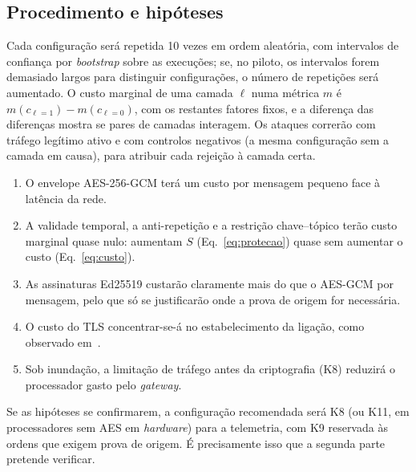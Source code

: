 \subsection{Procedimento e hipóteses}

Cada configuração será repetida 10 vezes em ordem aleatória, com intervalos de
confiança por \emph{bootstrap} sobre as execuções; se, no piloto, os intervalos forem
demasiado largos para distinguir configurações, o número de repetições será
aumentado. O custo marginal de uma camada
$\ell$ numa métrica $m$ é $m(c_{\ell=1}) - m(c_{\ell=0})$, com os restantes fatores
fixos, e a diferença das diferenças mostra se pares de camadas interagem. Os
ataques correrão com tráfego legítimo ativo e com controlos negativos (a mesma
configuração sem a camada em causa), para atribuir cada rejeição à camada certa.

\begin{enumerate}[label=\textbf{H\arabic*.}, leftmargin=*]
  \item O envelope AES-256-GCM terá um custo por mensagem pequeno face à latência
    da rede.
  \item A validade temporal, a anti-repetição e a restrição chave--tópico terão
    custo marginal quase nulo: aumentam $S$ (Eq.~\eqref{eq:protecao}) quase sem aumentar o custo
    (Eq.~\eqref{eq:custo}).
  \item As assinaturas Ed25519 custarão claramente mais do que o AES-GCM por
    mensagem, pelo que só se justificarão onde a prova de origem for necessária.
  \item O custo do TLS concentrar-se-á no estabelecimento da ligação, como observado
    em~\cite{prantl2021performance}.
  \item Sob inundação, a limitação de tráfego antes da criptografia (K8) reduzirá o
    processador gasto pelo \emph{gateway}.
\end{enumerate}

Se as hipóteses se confirmarem, a configuração recomendada será K8 (ou K11, em
processadores sem AES em \emph{hardware}) para a telemetria, com K9 reservada às
ordens que exigem prova de origem. É precisamente isso que a segunda parte pretende
verificar.
